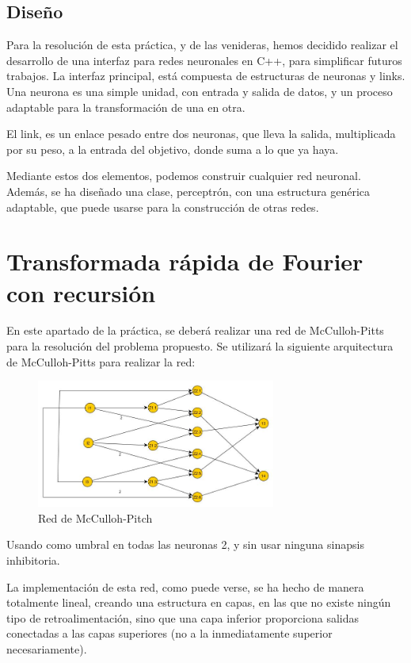 \documentclass[12pt]{article}
\begin{document}
\subsection*{Diseño}
Para la resolución de esta práctica, y de las venideras, hemos decidido realizar el desarrollo de una interfaz para redes neuronales en C++, para simplificar futuros trabajos. 
La interfaz principal, está compuesta de estructuras de neuronas y links. Una neurona es una simple unidad, con entrada y salida de datos, y un proceso adaptable para la transformación de una en otra.

El link, es un enlace pesado entre dos neuronas, que lleva la salida, multiplicada por su peso, a la entrada del objetivo, donde suma a lo que ya haya.

Mediante estos dos elementos, podemos construir cualquier red neuronal.
Además, se ha diseñado una clase, perceptrón, con una estructura genérica adaptable, que puede usarse para la construcción de otras redes.

\newpage
\section{Transformada rápida de Fourier con recursión}
En este apartado de la práctica, se deberá realizar una red de McCulloh-Pitts para la resolución del problema propuesto.
Se utilizará la siguiente arquitectura de McCulloh-Pitts para realizar la red:

\begin{figure}[h!]
    \label{fig:fig1}
  \centering
       \includegraphics[width=0.7\textwidth]{recursos/fig1}
    \caption{Red de McCulloh-Pitch}
\end{figure} 

Usando como umbral en todas las neuronas 2, y sin usar ninguna sinapsis inhibitoria.

La implementación de esta red, como puede verse, se ha hecho de manera totalmente lineal, creando una estructura en capas, en las que no existe ningún tipo de retroalimentación, sino que una capa inferior proporciona salidas conectadas a las capas superiores (no a la inmediatamente superior necesariamente).
\end{document}
